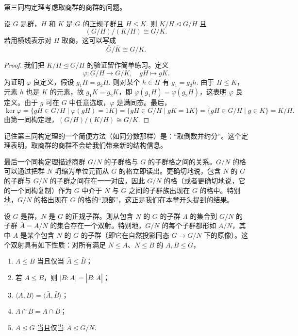 第三同构定理考虑取商群的商群的问题。

\begin{theorem}[第三同构定理]\label{thm:3.19}
设 \(G\) 是群，\(H\) 和 \(K\) 是 \(G\) 的正规子群且 \(H \leq K\). 则 \(K/H \trianglelefteq G/H\) 且
\[
(G/H)/(K/H) \cong G/K.
\]
若用横线表示对 \(H\) 取商，这可以写成
\[
\overline{G}/\overline{K} \cong G/K.
\]
\end{theorem}

\begin{proof}
我们把 \(K/H \trianglelefteq G/H\) 的验证留作简单练习。定义
\[
\varphi : G/H \to G/K, \quad gH \mapsto gK.
\]
为证明 \(\varphi\) 良定义，假设 \(g_1 H = g_2 H\). 则对某个 \(h \in H\) 有 \(g_1 = g_2 h\). 由于 \(H \leq K\)，元素 \(h\) 也是 \(K\) 的元素，故 \(g_1 K = g_2 K\)，即 \(\varphi(g_1 H) = \varphi(g_2 H)\)，这表明 \(\varphi\) 良定义。由于 \(g\) 可在 \(G\) 中任意选取，\(\varphi\) 是满同态。最后，
\[
\ker \varphi = \{gH \in G/H \mid \varphi(gH) = 1K\} = \{gH \in G/H \mid gK = 1K\} = \{gH \in G/H \mid g \in K\} = K/H.
\]
由第一同构定理，\((G/H)/(K/H) \cong G/K\).
\end{proof}

记住第三同构定理的一个简便方法（如同分数那样）是：“取倒数并约分”。这个定理表明，取商群的商群不会给我们带来新的结构信息。

最后一个同构定理描述商群 \(G/N\) 的子群格与 \(G\) 的子群格之间的关系。\(G/N\) 的格可以通过把群 \(N\) 坍缩为单位元而从 \(G\) 的格立即读出。更确切地说，包含 \(N\) 的 \(G\) 的子群与 \(G/N\) 的子群之间存在一一对应，因此 \(G/N\) 的格（或者更确切地说，它的一个同构复制）作为 \(G\) 中介于 \(N\) 与 \(G\) 之间的子群族出现在 \(G\) 的格中。特别地，\(G/N\) 的格出现在 \(G\) 的格的“顶部”，这正是我们在本章开头提到的结果。

\begin{theorem}[第四同构定理或格子同构定理]\label{thm:3.20}
设 \(G\) 是群，\(N\) 是 \(G\) 的正规子群。则从包含 \(N\) 的 \(G\) 的子群 \(A\) 的集合到 \(G/N\) 的子群 \(\bar{A} = A/N\) 的集合存在一个双射。特别地，\(G/N\) 的每个子群都形如 \(A/N\)，其中 \(A\) 是某个包含 \(N\) 的 \(G\) 的子群（即它在自然投影同态 \(G \to G/N\) 下的原像）。这个双射具有如下性质：对所有满足 \(N \leq A\)、\(N \leq B\) 的 \(A, B \leq G\)，
\begin{enumerate}[label=(\arabic*)]
\item \(A \leq B\) 当且仅当 \(\bar{A} \leq \bar{B}\)；
\item 若 \(A \leq B\)，则 \(|B : A| = |\bar{B} : \bar{A}|\)；
\item \(\overline{\langle A, B \rangle} = \langle \bar{A}, \bar{B} \rangle\)；
\item \(\overline{A \cap B} = \bar{A} \cap \bar{B}\)；
\item \(A \trianglelefteq G\) 当且仅当 \(\bar{A} \trianglelefteq G/N\).
\end{enumerate}
\end{theorem}

